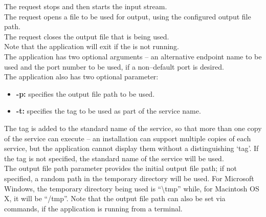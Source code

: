 The  request stops and then
starts the input stream.\\

The  request opens a file to be
used for output, using the configured output file path.\\

The  request closes the output
file that is being used.\\

Note that the application will exit if the
 is not running.\\

The application has two optional arguments -- an alternative endpoint name to be used and
the port number to be used, if a non--default port is desired.\\

The application also has two optional parameter:
\begin{itemize}
\item \textbf{-p:} specifies the output file path to be used. 
\item \textbf{-t:} specifies the tag to be used as part of the service name.
\end{itemize}
The tag is added to the standard name of the service, so that more than one copy of the
service can execute -- an \mplusm{} installation can support multiple copies of each
 service, but the 
application cannot display them without a distinguishing `tag'.
If the tag is not specified, the standard name of the service will be used.\\

The output file path parameter provides the initial output file path; if not specified, a
random path in the temporary directory will be used.
For Microsoft Windows, the temporary directory being used is ``\textbackslash{}tmp''
while, for Macintosh OS X, it will be ``/tmp''.
Note that the output file path can also be set via commands, if the application is
running from a terminal.\\

